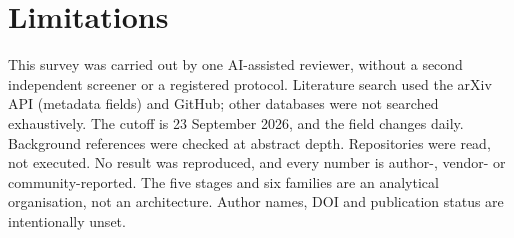 \section{Limitations}\label{sec:limitations}

This survey was carried out by one AI-assisted reviewer, without a second independent screener or a registered protocol. Literature search used the arXiv API (metadata fields) and GitHub; other databases were not searched exhaustively. The cutoff is 23 September 2026, and the field changes daily. Background references were checked at abstract depth. Repositories were read, not executed. No result was reproduced, and every number is author-, vendor- or community-reported. The five stages and six families are an analytical organisation, not an architecture. Author names, DOI and publication status are intentionally unset.

